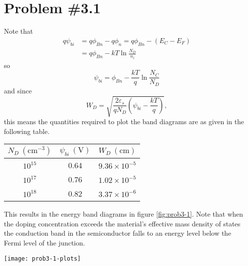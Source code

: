 \documentclass{article}
\begin{document}
\section*{Problem \#3.1}
Note that
\begin{align*}
q \psi_{bi} &= q \phi_{Bn} - q \phi_n = q \phi_{Bn} - (E_C - E_F) \\
            &= q \phi_{Bn} - kT \ln\frac{N_D}{n_i} 
\end{align*}
so
$$
\psi_{bi} = \phi_{Bn} - \frac{kT}{q} \ln\frac{N_C}{N_D}
$$
and since
$$
W_D = \sqrt{\frac{2 \varepsilon_s}{q N_D} 
            \left(\psi_{bi} - \frac{kT}{q}\right)},
$$
this means the quantities required to plot the band diagrams are as given in 
the following table.
                              
\begin{tabular}{c | c c}
$N_D ~(\mathrm{cm}^{-3})$ & $\psi_{bi} ~(\mathrm{V})$ & $W_D ~(\mathrm{cm})$ \\
\hline
$10^{15}$ & 0.64 & $9.36 \times 10^{-5}$ \\
$10^{17}$ & 0.76 & $1.02 \times 10^{-5}$ \\
$10^{18}$ & 0.82 & $3.37 \times 10^{-6}$
\end{tabular}

This results in the energy band diagrams in figure \ref{fig:prob3-1}.
Note that when the doping concentration exceeds the material's effective
mass density of states the conduction band in the semiconductor falls to
an energy level below the Fermi level of the junction.

\begin{sidewaysfigure}
  \centering
  \texttt{[image: prob3-1-plots]}
  \caption{Energy band diagrams for problem \#3.1. \label{fig:prob3-1}}
\end{sidewaysfigure}
\end{document}
